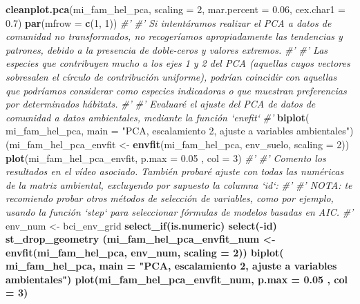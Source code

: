 \documentclass[11pt,]{article}
\newenvironment{Shaded}{\begin{snugshade}}{\end{snugshade}}
\newcommand{\KeywordTok}[1]{\textcolor[rgb]{0.13,0.29,0.53}{\textbf{#1}}}
\newcommand{\DataTypeTok}[1]{\textcolor[rgb]{0.13,0.29,0.53}{#1}}
\newcommand{\DecValTok}[1]{\textcolor[rgb]{0.00,0.00,0.81}{#1}}
\newcommand{\FloatTok}[1]{\textcolor[rgb]{0.00,0.00,0.81}{#1}}
\newcommand{\StringTok}[1]{\textcolor[rgb]{0.31,0.60,0.02}{#1}}
\newcommand{\CommentTok}[1]{\textcolor[rgb]{0.56,0.35,0.01}{\textit{#1}}}
\newcommand{\OperatorTok}[1]{\textcolor[rgb]{0.81,0.36,0.00}{\textbf{#1}}}
\newcommand{\NormalTok}[1]{#1}
\begin{document}
\begin{Shaded}
\begin{Highlighting}[]
{{{{{{{{{\KeywordTok{cleanplot.pca}\NormalTok{(mi_fam_hel_pca, }\DataTypeTok{scaling =} \DecValTok{2}\NormalTok{, }\DataTypeTok{mar.percent =} \FloatTok{0.06}\NormalTok{, }\DataTypeTok{cex.char1 =} \FloatTok{0.7}\NormalTok{)}
\KeywordTok{par}\NormalTok{(}\DataTypeTok{mfrow =} \KeywordTok{c}\NormalTok{(}\DecValTok{1}\NormalTok{, }\DecValTok{1}\NormalTok{))}
\CommentTok{#' }
\CommentTok{#' Si intentáramos realizar el PCA a datos de comunidad no transformados, no recogeríamos apropiadamente las tendencias y patrones, debido a la presencia de doble-ceros y valores extremos.}
\CommentTok{#' }
\CommentTok{#' Las especies que contribuyen mucho a los ejes 1 y 2 del PCA (aquellas cuyos vectores sobresalen el círculo de contribución uniforme), podrían coincidir con aquellas que podríamos considerar como especies indicadoras o que muestran preferencias por determinados hábitats.}
\CommentTok{#' }
\CommentTok{#' Evaluaré el ajuste del PCA de datos de comunidad a datos ambientales, mediante la función `envfit`}
\CommentTok{#' }
\KeywordTok{biplot}\NormalTok{(}
\NormalTok{  mi_fam_hel_pca,}
  \DataTypeTok{main =} \StringTok{"PCA, escalamiento 2, ajuste a variables ambientales"}\NormalTok{)}
\NormalTok{(mi_fam_hel_pca_envfit <-}\StringTok{ }\KeywordTok{envfit}\NormalTok{(mi_fam_hel_pca, env_suelo, }\DataTypeTok{scaling =} \DecValTok{2}\NormalTok{))}
\KeywordTok{plot}\NormalTok{(mi_fam_hel_pca_envfit, }\DataTypeTok{p.max =} \FloatTok{0.05}\NormalTok{ , }\DataTypeTok{col =} \DecValTok{3}\NormalTok{)}
\CommentTok{#' }
\CommentTok{#' Comento los resultados en el vídeo asociado. También probaré ajuste con todas las numéricas de la matriz ambiental, excluyendo por supuesto la columna `id`:}
\CommentTok{#' }
\CommentTok{#' NOTA: te recomiendo probar otros métodos de selección de variables, como por ejemplo, usando la función `step` para seleccionar fórmulas de modelos basadas en AIC.}
\CommentTok{#' }
\NormalTok{env_num <-}\StringTok{ }\NormalTok{bci_env_grid }\OperatorTok{%
\StringTok{  }\KeywordTok{select_if}\NormalTok{(is.numeric) }\OperatorTok{%
\StringTok{  }\KeywordTok{select}\NormalTok{(}\OperatorTok{-}\NormalTok{id) }\OperatorTok{%
\StringTok{  }\NormalTok{st_drop_geometry}
\NormalTok{(mi_fam_hel_pca_envfit_num <-}\StringTok{ }\KeywordTok{envfit}\NormalTok{(mi_fam_hel_pca, env_num, }\DataTypeTok{scaling =} \DecValTok{2}\NormalTok{))}
\KeywordTok{biplot}\NormalTok{(}
\NormalTok{  mi_fam_hel_pca,}
  \DataTypeTok{main =} \StringTok{"PCA, escalamiento 2, ajuste a variables ambientales"}\NormalTok{)}
\KeywordTok{plot}\NormalTok{(mi_fam_hel_pca_envfit_num, }\DataTypeTok{p.max =} \FloatTok{0.05}\NormalTok{ , }\DataTypeTok{col =} \DecValTok{3}\NormalTok{)}
}}}}}}}}}}}}
\end{Highlighting}
\end{Shaded}
\end{document}
